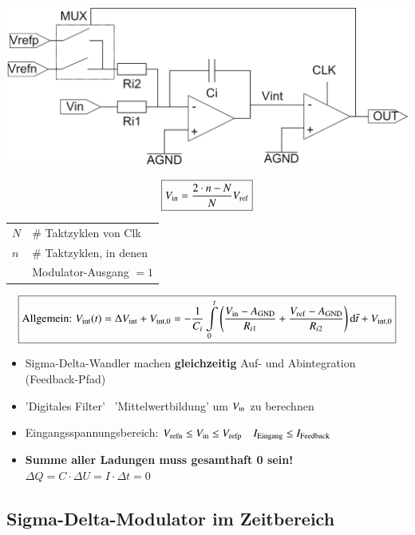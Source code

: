 \begin{minipage}[c]{0.48\columnwidth}
    \includegraphics[width=\columnwidth]{images/sigma-delta-wandler.png}
\end{minipage}
\hfill
\begin{minipage}[c]{0.48\columnwidth}
    $$ \boxed{V_{\rm in} = \frac{2 \cdot n  - N}{N} V_{\rm ref}} $$

    \begin{tabular}{ll}
        $N$ & \# Taktzyklen von Clk \\
        $n$ & \# Taktzyklen, in denen \\
            & Modulator-Ausgang $=1$
    \end{tabular}
\end{minipage}
$$\boxed{\text{Allgemein: } V_{\rm int}(t) = \Delta V_{\rm int} + V_{\rm int,0} 
    = - \frac{1}{C_i} \int\limits_0^{t} \Bigg( \frac{V_{\rm in} - A_{ \rm GND}}{R_{i1}} + \frac{V_{\rm ref} - A_{ \rm GND}}{R_{i2}} \Bigg) \mathop{} \! \mathrm{d} \tilde{t} + V_{\rm int,0} }$$

\begin{itemize}
    \item Sigma-Delta-Wandler machen \textbf{gleichzeitig} Auf- und Abintegration (Feedback-Pfad)
    \item 'Digitales Filter' \textrightarrow\ 'Mittelwertbildung' um $V_{\rm in}$  zu berechnen
    \item Eingangsspannungsbereich: $V_{\rm refn} \leq V_{\rm in} \leq V_{\rm refp}$ \textrightarrow\ $I_{\rm Eingang} \leq I_{\rm Feedback}$
    \item \textbf{Summe aller Ladungen muss gesamthaft 0 sein!} \textrightarrow\ $\Delta Q = C \cdot \Delta U = I \cdot \Delta t = 0$
\end{itemize}


\subsection{Sigma-Delta-Modulator im Zeitbereich}

